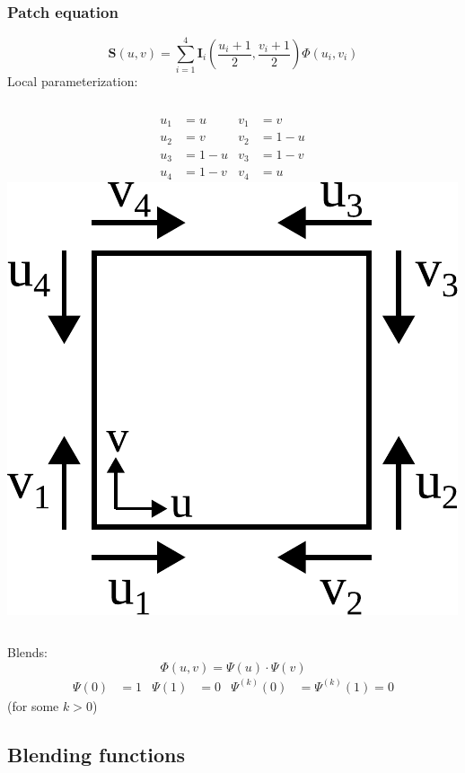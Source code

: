 \documentclass{beamer}
\begin{document}
\begin{frame}
  \frametitle{Patch equation}
  \[\mathbf{S}(u,v)=\sum_{i=1}^{4}\mathbf{I}_{i}\left(\frac{u_{i}+1}{2},\frac{v_{i}+1}{2}\right)\Phi(u_{i},v_{i})\]
  Local parameterization:
  \begin{columns}   
    \[
    \begin{aligned}
      u_{1}&=u&v_{1}&=v\\
      u_{2}&=v&v_{2}&=1-u\\
      u_{3}&=1-u&v_{3}&=1-v\\
      u_{4}&=1-v&v_{4}&=u
    \end{aligned}
    \]
    \centering
    \includegraphics[width=.9\textwidth]{images/param4.pdf}
  \end{columns}
  Blends:
  \[\Phi(u,v)=\Psi(u)\cdot\Psi(v)\]
  \[\begin{aligned}
  \Psi(0)&=1&\Psi(1)&=0&\Psi^{(k)}(0)&=\Psi^{(k)}(1)=0
  \end{aligned}\]
  \centering (for some $k>0$)
\end{frame}

\subsection{Blending functions}
\end{document}
